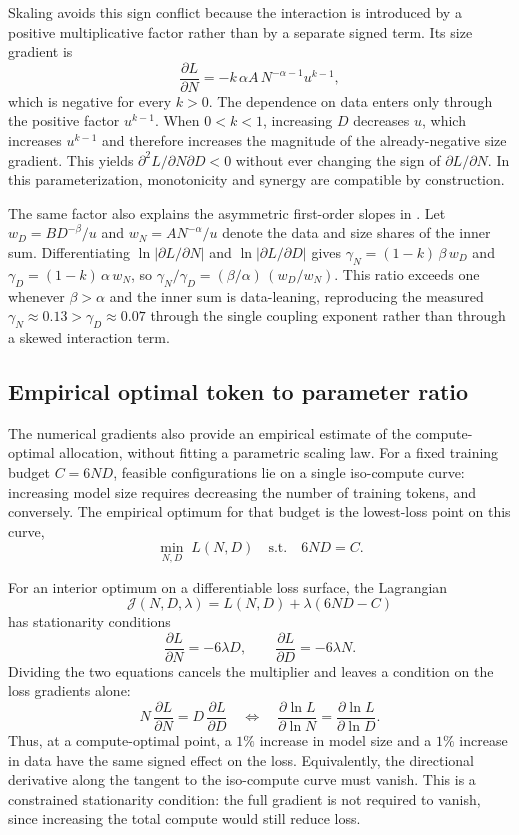 \documentclass[]{fairmeta}
\newcommand{\ska}{Skaling}
\begin{document}
\ska{} avoids this sign conflict because the interaction is introduced by a positive multiplicative factor rather than by a separate signed term. Its size gradient is
\[
\frac{\partial L}{\partial N}=-k\,\alpha A\,N^{-\alpha-1}u^{k-1},
\]
which is negative for every $k>0$. The dependence on data enters only through the positive factor $u^{k-1}$. When $0<k<1$, increasing $D$ decreases $u$, which increases $u^{k-1}$ and therefore increases the magnitude of the already-negative size gradient. This yields $\partial^2 L/\partial N\partial D<0$ without ever changing the sign of $\partial L/\partial N$. In this parameterization, monotonicity and synergy are compatible by construction.

The same factor also explains the asymmetric first-order slopes in . Let $w_D=BD^{-\beta}/u$ and $w_N=AN^{-\alpha}/u$ denote the data and size shares of the inner sum. Differentiating $\ln|\partial L/\partial N|$ and $\ln|\partial L/\partial D|$ gives $\gamma_N=(1-k)\,\beta\,w_D$ and $\gamma_D=(1-k)\,\alpha\,w_N$, so $\gamma_N/\gamma_D=(\beta/\alpha)\,(w_D/w_N)$. This ratio exceeds one whenever $\beta>\alpha$ and the inner sum is data-leaning, reproducing the measured $\gamma_N\approx0.13>\gamma_D\approx0.07$ through the single coupling exponent rather than through a skewed interaction term.

\subsection{Empirical optimal token to parameter ratio}
\label{app:emp_opt_ratio}

The numerical gradients also provide an empirical estimate of the compute-optimal allocation, without fitting a parametric scaling law. For a fixed training budget $C=6ND$, feasible configurations lie on a single iso-compute curve: increasing model size requires decreasing the number of training tokens, and conversely. The empirical optimum for that budget is the lowest-loss point on this curve,
\[
\min_{N,D}\; L(N,D) \quad \mathrm{s.t.} \quad 6ND = C .
\]

For an interior optimum on a differentiable loss surface, the Lagrangian
\[
\mathcal{J}(N,D,\lambda)=L(N,D)+\lambda(6ND-C)
\]
has stationarity conditions
\[
\frac{\partial L}{\partial N} = -6\lambda D, \qquad \frac{\partial L}{\partial D} = -6\lambda N .
\]
Dividing the two equations cancels the multiplier and leaves a condition on the loss gradients alone:
\begin{equation}
N\,\frac{\partial L}{\partial N} = D\,\frac{\partial L}{\partial D}
\quad\Longleftrightarrow\quad
\frac{\partial \ln L}{\partial \ln N} = \frac{\partial \ln L}{\partial \ln D}.
\end{equation}
Thus, at a compute-optimal point, a $1\%$ increase in model size and a $1\%$ increase in data have the same signed effect on the loss. Equivalently, the directional derivative along the tangent to the iso-compute curve must vanish. This is a constrained stationarity condition: the full gradient is not required to vanish, since increasing the total compute would still reduce loss.
\end{document}
